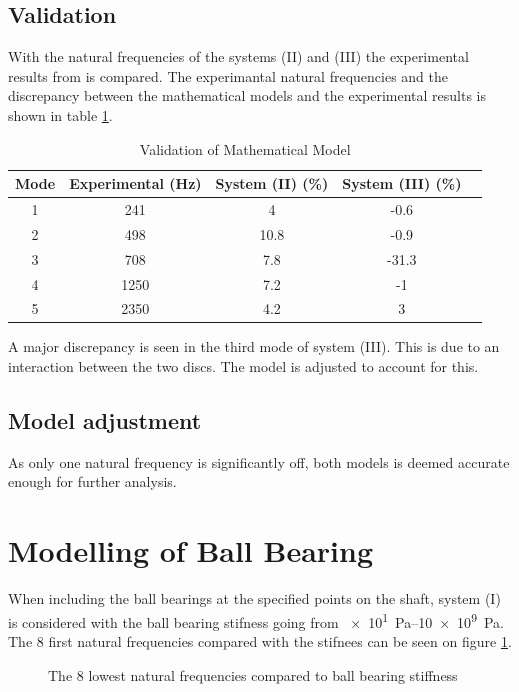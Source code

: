 \subsection{Validation}
With the natural frequencies of the systems (II) and (III) the experimental results from \cite[6]{Problem} is compared. The experimantal natural frequencies and the discrepancy between the mathematical models and the experimental results is shown in table \ref{tab:validation_two_discs}.
\begin{table}[htbp]
    \begin{adjustwidth}{-1cm}{-1cm}
    \centering
    \caption{Validation of Mathematical Model}
    \label{tab:validation_two_discs}
    \begin{tabular}{@{}ccccc@{}}
        \toprule
        Mode    &   Experimental (\si{\hertz})    &   System (II) (\si{\percent})    &   System (III) (\si{\percent})  \\ \midrule
        1       &   241     &   4       &   -0.6    \\
        2       &   498     &   10.8    &   -0.9    \\
        3       &   708     &   7.8     &   -31.3   \\
        4       &   1250    &   7.2     &   -1      \\ 
        5       &   2350    &   4.2     &   3       \\ \bottomrule
    \end{tabular}
    \end{adjustwidth}
\end{table}

A major discrepancy is seen in the third mode of system (III). This is due to an interaction between the two discs. The model is adjusted to account for this.

\subsection{Model adjustment}
As only one natural frequency is significantly off, both models is deemed accurate enough for further analysis.

\section{Modelling of Ball Bearing}
When including the ball bearings at the specified points on the shaft, system (I) is considered with the ball bearing stifness going from \SIrange{e1}{10e9}{\pascal}.
The 8 first natural frequencies compared with the stifnees can be seen on figure \ref{fig:ball_bearing_stiffness}.
\begin{figure}[htbp]
    \centering
    
    \caption{The 8 lowest natural frequencies compared to ball bearing stiffness}
    \label{fig:ball_bearing_stiffness}
\end{figure}

